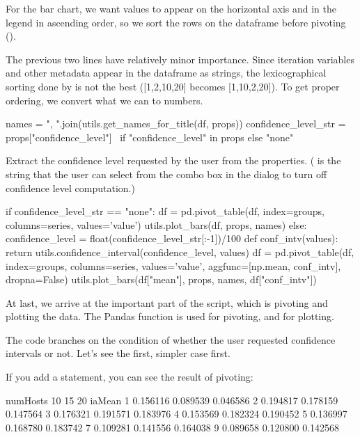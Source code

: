 For the bar chart, we want values to appear on the horizontal axis and in the
legend in ascending order, so we sort the rows on the dataframe before pivoting
().

The previous two lines have relatively minor importance. Since iteration
variables and other metadata appear in the dataframe as strings, the
lexicographical sorting done by  is not the best
([1,2,10,20] becomes [1,10,2,20]). To get proper ordering, we convert what we
can to numbers.

\begin{python}
names = ", ".join(utils.get_names_for_title(df, props))
confidence_level_str = props["confidence_level"] \
                       if "confidence_level" in props else "none"
\end{python}

Extract the confidence level requested by the user from the properties.
(\ttt{"none"} is the string that the user can select from the combo box in the
dialog to turn off confidence level computation.)

\begin{python}
if confidence_level_str == "none":
    df = pd.pivot_table(df, index=groups, columns=series, values='value')
    utils.plot_bars(df, props, names)
else:
    confidence_level = float(confidence_level_str[:-1])/100
    def conf_intv(values):
        return utils.confidence_interval(confidence_level, values)
    df = pd.pivot_table(df, index=groups, columns=series, values='value',
                        aggfunc=[np.mean, conf_intv], dropna=False)
    utils.plot_bars(df["mean"], props, names, df["conf_intv"])
\end{python}

At last, we arrive at the important part of the script, which is pivoting and
plotting the data. The Pandas \ttt{pd.pivot\_table()} function is used for
pivoting, and \ttt{utils.plot\_bars()} for plotting.

The code branches on the condition of whether the user requested confidence
intervals or not. Let's see the first, simpler case first.

If you add a  statement, you can see the result of pivoting:

\begin{commandline}
numHosts        10        15        20
iaMean
1         0.156116  0.089539  0.046586
2         0.194817  0.178159  0.147564
3         0.176321  0.191571  0.183976
4         0.153569  0.182324  0.190452
5         0.136997  0.168780  0.183742
7         0.109281  0.141556  0.164038
9         0.089658  0.120800  0.142568
\end{commandline}

